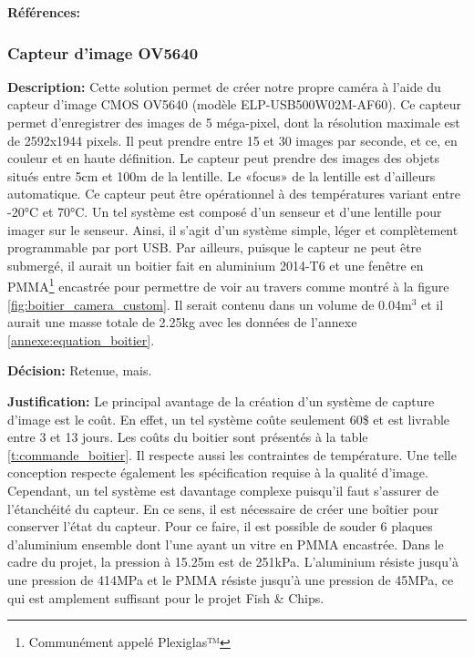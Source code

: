 \textbf{Références:} \cite{GoFishCam} 


\subsubsection{Capteur d'image OV5640}
\label{subsubsection:camera_custom}

\textbf{Description:} Cette solution permet de créer notre propre caméra à l'aide du capteur d'image CMOS OV5640 (modèle ELP-USB500W02M-AF60). Ce capteur permet d'enregistrer des images de 5 méga-pixel, dont la résolution maximale est de 2592x1944 pixels. Il peut prendre entre 15 et 30 images par seconde, et ce, en couleur et en haute définition. Le capteur peut prendre des images des objets situés entre 5cm et 100m de la lentille. Le «focus» de la lentille est d'ailleurs automatique. Ce capteur peut être opérationnel à des températures variant entre -20°C et 70°C. Un tel système est composé d'un senseur et d'une lentille pour imager sur le senseur. Ainsi, il s'agit d'un système simple, léger et complètement programmable par port USB. Par ailleurs, puisque le capteur ne peut être submergé, il aurait un boitier fait en aluminium 2014-T6 et une fenêtre en PMMA\footnote{Communément appelé Plexiglas™} encastrée pour permettre de voir au travers comme montré à la figure \ref{fig:boitier_camera_custom}. Il serait contenu dans un volume de 0.04m$^3$ et il aurait une masse totale de 2.25kg avec les données de l'annexe \ref{annexe:equation_boitier}. \vspace{5mm}

\textbf{Décision:} Retenue, mais. \vspace{5mm}

\textbf{Justification:} Le principal avantage de la création d'un système de capture d'image est le coût. En effet, un tel système coûte seulement 60\$ et est livrable entre 3 et 13 jours. Les coûts du boitier sont présentés à la table \ref{t:commande_boitier}. Il respecte aussi les contraintes de température. Une telle conception respecte également les spécification requise à la qualité d'image. Cependant, un tel système est davantage complexe puisqu'il faut s'assurer de l'étanchéité du capteur. En ce sens, il est nécessaire de créer une boîtier pour conserver l'état du capteur. Pour ce faire, il est possible de souder 6 plaques d'aluminium ensemble dont l'une ayant un vitre en PMMA encastrée. Dans le cadre du projet, la pression à 15.25m est de 251kPa. L'aluminium résiste jusqu'à une pression de 414MPa et le PMMA résiste jusqu'à une pression de 45MPa, ce qui est amplement suffisant pour le projet Fish \& Chips. \vspace{5mm}


